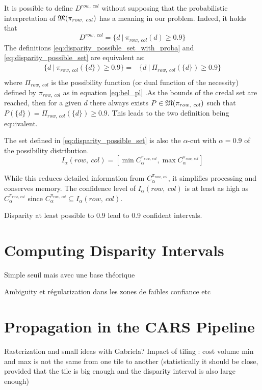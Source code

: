 It is possible to define \( D^{row,~col} \) without supposing that the probabilistic interpretation of \( {\mathfrak{M}}(\pi_{row,~col}) \) has a meaning in our problem. Indeed, it holds that 
\begin{equation}
    D^{row,~col}=\{ d~|~\pi_{row,~col}(d)\geqslant 0.9 \}\label{eq:disparity_possible_set}
\end{equation}
The definitions \eqref{eq:disparity_possible_set_with_proba} and \eqref{eq:disparity_possible_set} are equivalent as:
\begin{align*}
    \{ d~|~\pi_{row,~col}(\{d\})\geqslant 0.9 \} =& \{ d~|~\Pi_{row,~col}(\{d\})\geqslant 0.9 \}\\
\end{align*}
where \( \Pi_{row,~col} \) is the possibility function (or dual function of the necessity) defined by \( \pi_{row,~col} \) as in equation \eqref{eq:bel_pl} .As the bounds of the credal set are reached, then for a given \(d\) there always exists \(P\in{\mathfrak{M}}(\pi_{row,~col})\) such that \( P(\{d\}) = \Pi_{row,~col}(\{d\})\geqslant 0.9\). This leads to the two definition being equivalent.

The set defined in \eqref{eq:disparity_possible_set} is also the \(\alpha\)-cut with \(\alpha=0.9\) of the possibility distribution. 
\begin{equation}
    I_\alpha(row,~col) = [\min C^{\pi_{row,~col}}_\alpha, \max C^{\pi_{row,~col}}_\alpha] \label{eq:confidence_interval}
\end{equation}

While this reduces detailed information from \( C^{\pi_{row,~col}}_\alpha \), it simplifies processing and conserves memory. The confidence level of \( I_\alpha(row,~col) \) is at least as high as \( C^{\pi_{row,~col}}_\alpha \) since \( C^{\pi_{row,~col}}_\alpha \subseteq I_\alpha(row,~col) \). 

Disparity at least possible to 0.9 lead to 0.9 confident intervals. 

\section{Computing Disparity Intervals}
Simple seuil mais avec une base théorique

Ambiguity et régularization dans les zones de faibles confiance etc
\section{Propagation in the CARS Pipeline}
Rasterization and small ideas with Gabriela?
Impact of tiling : cost volume min and max is not the same from one tile to another (statistically it should be close, provided that the tile is big enough and the disparity interval is also large enough)

